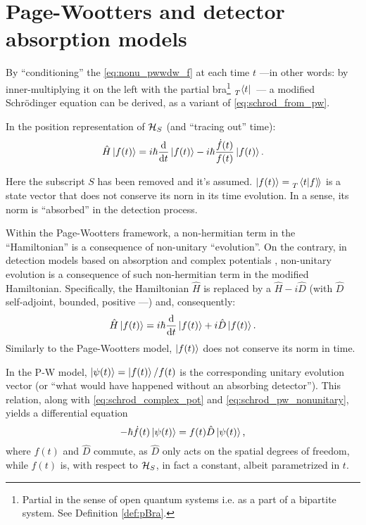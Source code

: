 \section{Page-Wootters and detector absorption models}

By ``conditioning'' the \eqref{eq:nonu_pwwdw_f} at each time $t$
---in other words: by inner-multiplying it on the left with the partial bra\footnote{
  Partial in the sense of open quantum systems
  i.e. as a part of a bipartite system.
  See Definition \ref{def:pBra}.
}
$\prescript{}{T}{\bra{t}}$~---
a modified Schr{\"o}dinger equation
can be derived,
as a variant of \eqref{eq:schrod_from_pw}.

In the position representation of $\mathcal{H}_S$ (and ``tracing out'' time):
\begin{equation}\label{eq:schrod_pw_nonunitary}
  \hat{H} \ket{f(t)} = i\hbar\dv{t}\ket{f(t)} -i\hbar\frac{\dot{f}(t)}{f(t)}\ket{f(t)} \text{.}
\end{equation}

Here the subscript $S$ has been removed and it's assumed.
$\ket{f(t)} = \prescript{}{T}{\left.\left\langle t \middle| f \right\rangle\!\right\rangle}$
is a state vector that does not conserve its norn in its time evolution.
In a sense, its norm is ``absorbed'' in the detection process.

Within the Page-Wootters framework, a non-hermitian term in the ``Hamiltonian''
is a consequence of non-unitary ``evolution''.
On the contrary, in detection models based on absorption and complex potentials
\parencite{RuschhauptAbsorption}, non-unitary evolution is a consequence
of such non-hermitian term in the modified Hamiltonian.
Specifically, the Hamiltonian $\hat{H}$ is replaced by a $\hat{H} - i\hat{D}$
(with $\hat{D}$ self-adjoint, bounded, positive ---\cite{RuschhauptAbsorption})
and, consequently:
\begin{equation}\label{eq:schrod_complex_pot}
  \hat{H} \ket{f(t)} = i\hbar\dv{t}\ket{f(t)} +i\hat{D}\ket{f(t)} \text{.}
\end{equation}
Similarly to the Page-Wootters model, $\ket{f(t)}$ does not conserve its norm in time.

In the P-W model, $\ket{\psi(t)} = \ket{f(t)}/f(t)$
is the corresponding unitary evolution vector
(or ``what would have happened without an absorbing detector'').
This relation, along with \eqref{eq:schrod_complex_pot} and \eqref{eq:schrod_pw_nonunitary},
yields a differential equation
\begin{equation}\label{eq:phi_diffeq}
  -\hbar\dot{f}(t)\ket{\psi(t)} = f(t) \hat{D} \ket{\psi(t)} \text{,}
\end{equation}
where $f(t)$ and $\hat{D}$ commute, as $\hat{D}$ only acts on the spatial degrees of freedom,
while $f(t)$ is, with respect to $\mathcal{H}_S$, in fact a constant, albeit parametrized in $t$.

